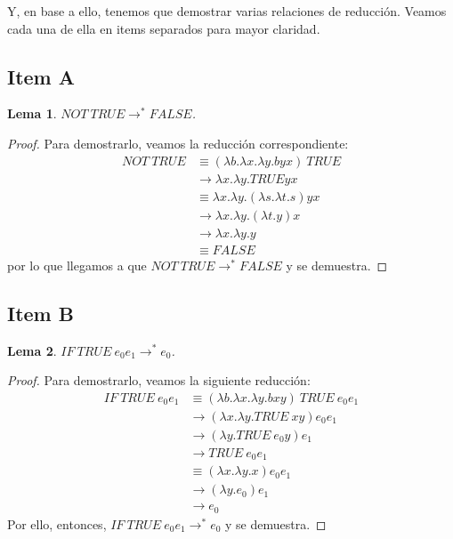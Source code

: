 \documentclass{article}
\newtheorem*{lemma*}{Lema}
\begin{document}
Y, en base a ello, tenemos que demostrar varias relaciones de reducción.
Veamos cada una de ella en items separados para mayor claridad.

\subsection*{Item A}
\begin{lemma*}
  $NOT\ TRUE \to^* FALSE$.
\end{lemma*}
\begin{proof}
  Para demostrarlo, veamos la reducción correspondiente:
  \begin{equation*}
    \begin{aligned}
      NOT\ TRUE &\equiv (\lambda b.\lambda x.\lambda y. byx)\ TRUE \\
               &\to \lambda x.\lambda y. TRUEyx \\ 
               &\equiv \lambda x.\lambda y. (\lambda s.\lambda t. s)yx \\ 
               &\to \lambda x.\lambda y. (\lambda t. y)x \\ 
               &\to \lambda x.\lambda y. y \\ 
               &\equiv FALSE
    \end{aligned}
  \end{equation*}
  por lo que llegamos a que $NOT\ TRUE \to^* FALSE$ y se demuestra.
\end{proof}

\subsection*{Item B}
\begin{lemma*}
  $IF\ TRUE\ e_0 e_1 \to^* e_0$.
\end{lemma*}
\begin{proof}
  Para demostrarlo, veamos la siguiente reducción:
  \begin{equation*}
    \begin{aligned}
      IF\ TRUE\ e_0 e_1 &\equiv (\lambda b. \lambda x. \lambda y. bxy)\ TRUE\ e_0 e_1 \\ 
                        &\to (\lambda x. \lambda y. TRUE\ xy) e_0 e_1 \\ 
                        &\to (\lambda y. TRUE\ e_0 y) e_1 \\ 
                        &\to TRUE\ e_0 e_1 \\ 
                        &\equiv (\lambda x.\lambda y. x) e_0 e_1 \\ 
                        &\to (\lambda y. e_0) e_1 \\ 
                        &\to e_0
    \end{aligned}
  \end{equation*}
  Por ello, entonces, $IF\ TRUE\ e_0 e_1 \to^* e_0$ y se demuestra.
\end{proof}
\end{document}
